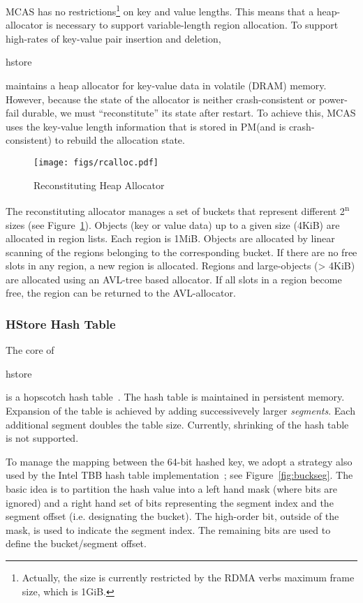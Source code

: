 \documentclass[letterpaper,twocolumn,10pt]{article}
\newcommand{\hstore}{\code{hstore}\xspace}
\newcommand{\pmem}{PM\xspace}
\newcommand{\code}[1]{\begin{ttcodefont}#1\end{ttcodefont}}
\begin{document}
MCAS has no restrictions\footnote{Actually, the size is currently
  restricted by the RDMA verbs maximum frame size, which is 1GiB.} on
key and value lengths.  This means that a heap-allocator is necessary
to support variable-length region allocation.  To support high-rates
of key-value pair insertion and deletion, \hstore maintains a heap
allocator for key-value data in volatile (DRAM) memory.  However,
because the state of the allocator is neither crash-consistent or
power-fail durable, we must ``reconstitute'' its state after restart.
To achieve this, MCAS uses the key-value length information that is
stored in \pmem (and is crash-consistent) to rebuild the allocation
state.

\begin{figure}
\centering
\texttt{[image: figs/rcalloc.pdf]}
\caption{Reconstituting Heap Allocator}
\label{fig:rcalloc}
\end{figure}

The reconstituting allocator manages a set of buckets that represent
different 2\textsuperscript{n} sizes (see Figure~\ref{fig:rcalloc}).
Objects (key or value data) up to a given size (4KiB) are allocated in
region lists.  Each region is 1MiB.  Objects are allocated by linear
scanning of the regions belonging to the corresponding bucket. If
there are no free slots in any region, a new region is allocated.
Regions and large-objects (> 4KiB) are allocated using an AVL-tree
based allocator.  If all slots in a region become free, the region can
be returned to the AVL-allocator.


\subsubsection{HStore Hash Table}

The core of \hstore is a hopscotch hash table~\cite{HerlihyST08}.  The
hash table is maintained in persistent memory. Expansion of the table
is achieved by adding successivevely larger \textit{segments}.  Each
additional segment doubles the table size.  Currently, shrinking of
the hash table is not supported.

To manage the mapping between the 64-bit hashed key, we adopt a
strategy also used by the Intel TBB hash table
implementation~\cite{Pheatt:2008:ITB:1352079.1352134}; see
Figure~\ref{fig:buckseg}.  The basic idea is to partition the hash
value into a left hand mask (where bits are ignored) and a right hand
set of bits representing the segment index and the segment offset
(i.e.  designating the bucket).  The high-order bit, outside of the
mask, is used to indicate the segment index.  The remaining bits are
used to define the bucket/segment offset.
\end{document}
